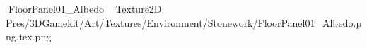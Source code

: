   FloorPanel01_Albedo             	   Texture2D
   P   res/3DGamekit/Art/Textures/Environment/Stonework/FloorPanel01_Albedo.png.tex.png